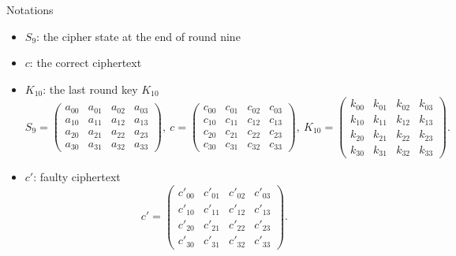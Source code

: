 \begin{frame}{Notations}
    \begin{itemize}
        \item $S_9$: the cipher state at the end of round nine
        \item $c$: the correct ciphertext 
        \item $K_{10}$: the last round key $K_{10}$
   {\small \[
    S_9=
     \begin{pmatrix}
    a_{00} & a_{01} & a_{02} & a_{03}\\
    a_{10} & a_{11} & a_{12} & a_{13}\\
    a_{20} & a_{21} & a_{22} & a_{23}\\
    a_{30} & a_{31} & a_{32} & a_{33}
    \end{pmatrix},\ 
    c=
    \begin{pmatrix}
    c_{00} & c_{01} & c_{02} & c_{03}\\
    c_{10} & c_{11} & c_{12} & c_{13}\\
    c_{20} & c_{21} & c_{22} & c_{23}\\
    c_{30} & c_{31} & c_{32} & c_{33}
    \end{pmatrix},\
    K_{10}=
    \begin{pmatrix}
    k_{00} & k_{01} & k_{02} & k_{03}\\
    k_{10} & k_{11} & k_{12} & k_{13}\\
    k_{20} & k_{21} & k_{22} & k_{23}\\
    k_{30} & k_{31} & k_{32} & k_{33}
    \end{pmatrix}.
    \]}
    \item $c'$: faulty ciphertext
        \[
c'=
\begin{pmatrix}
    c'_{00} & c'_{01} & c'_{02} & c'_{03}\\
    c'_{10} & c'_{11} & c'_{12} & c'_{13}\\
    c'_{20} & c'_{21} & c'_{22} & c'_{23}\\
    c'_{30} & c'_{31} & c'_{32} & c'_{33}
    \end{pmatrix}.
\]
    \end{itemize}
\end{frame}

